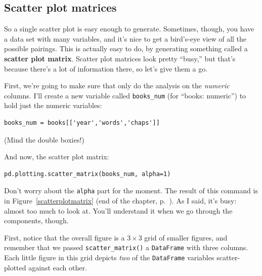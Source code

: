 \subsection{Scatter plot matrices}


So a single scatter plot is easy enough to generate. Sometimes, though, you
have a data set with many variables, and it's nice to get a bird's-eye view of
all the possible pairings. This is actually easy to do, by generating something
called a \textbf{scatter plot matrix}. Scatter plot matrices look pretty
``busy,'' but that's because there's a lot of information there, so let's give
them a go.


First, we're going to make sure that only do the analysis on the
\textit{numeric} columns. I'll create a new variable called \texttt{books\_num}
(for ``books: numeric'') to hold just the numeric variables:

\begin{Verbatim}[fontsize=\small,samepage=true,frame=single,framesep=3mm]
books_num = books[['year','words','chaps']]
\end{Verbatim}


(Mind the double boxies!)

And now, the scatter plot matrix:


\begin{Verbatim}[fontsize=\small,samepage=true,frame=single,framesep=3mm]
pd.plotting.scatter_matrix(books_num, alpha=1)
\end{Verbatim}

Don't worry about the \texttt{alpha} part for the moment. The result of this
command is in Figure~\ref{scatterplotmatrix} (end of the chapter,
p.~\pageref{scatterplotmatrix}). As I said, it's busy: almost too much to look
at. You'll understand it when we go through the components, though.

First, notice that the overall figure is a $3\times 3$ grid of smaller figures,
and remember that we passed \texttt{scatter\_matrix()} a \texttt{DataFrame}
with three columns. Each little figure in this grid depicts \textit{two} of the
\texttt{DataFrame} variables scatter-plotted against each other.

